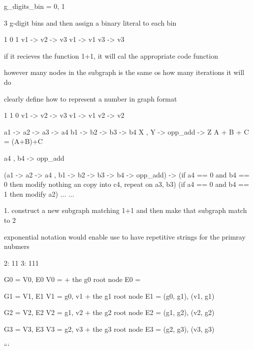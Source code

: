 g_digits_bin = {0, 1}

3 g-digit bins and then assign a binary literal to each bin

1     0     1
v1 -> v2 -> v3
v1 -> v1
v3 -> v3

if it recieves the function 1+1, it will cal the appropriate code function

however many nodes in the subgraph is the same os how many iterations it will do

clearly define how to represent a number in graph format

1     1     0
v1 -> v2 -> v3
v1 -> v1
v2 -> v2



a1 -> a2 -> a3 -> a4
b1 -> b2 -> b3 -> b4
X , Y -> opp_add -> Z
A + B + C = (A+B)+C

a4 , b4 -> opp_add

(a1 -> a2 -> a4 , b1 -> b2 -> b3 -> b4 -> opp_add) -> 
    (if a4 == 0 and b4 == 0 then modify nothing an copy into c4, repeat on a3, b3)
    (if a4 == 0 and b4 == 1 then modify a2)
    ...
    ...




1. construct a new subgraph matching 1+1 and then make that subgraph match to 2

exponential notation would enable use to have repetitive strings for the primray nubmers

2: 11
3: 111

G0 = {V0, E0}
V0 = {} + the g0 root node
E0 = {}

G1 = {V1, E1}
V1 = {g0, v1} + the g1 root node
E1 = {(g0, g1), (v1, g1)}

G2 = {V2, E2}
V2 = {g1, v2} + the g2 root node
E2 = {(g1, g2), (v2, g2)}

G3 = {V3, E3}
V3 = {g2, v3} + the g3 root node
E3 = {(g2, g3), (v3, g3)}








```
